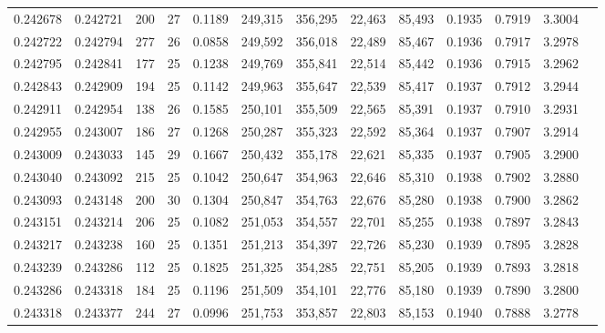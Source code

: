 \begin{tabular}{rrrrrrrrrrrrr}
0.242678 & 0.242721 &   200 &  27 &                                     0.1189 & 249,315 & 356,295 &  22,463 &  85,493 & 0.1935 & 0.7919 & 3.3004 \\
0.242722 & 0.242794 &   277 &  26 &                                     0.0858 & 249,592 & 356,018 &  22,489 &  85,467 & 0.1936 & 0.7917 & 3.2978 \\
0.242795 & 0.242841 &   177 &  25 &                                     0.1238 & 249,769 & 355,841 &  22,514 &  85,442 & 0.1936 & 0.7915 & 3.2962 \\
0.242843 & 0.242909 &   194 &  25 &                                     0.1142 & 249,963 & 355,647 &  22,539 &  85,417 & 0.1937 & 0.7912 & 3.2944 \\
0.242911 & 0.242954 &   138 &  26 &                                     0.1585 & 250,101 & 355,509 &  22,565 &  85,391 & 0.1937 & 0.7910 & 3.2931 \\
0.242955 & 0.243007 &   186 &  27 &                                     0.1268 & 250,287 & 355,323 &  22,592 &  85,364 & 0.1937 & 0.7907 & 3.2914 \\
0.243009 & 0.243033 &   145 &  29 &                                     0.1667 & 250,432 & 355,178 &  22,621 &  85,335 & 0.1937 & 0.7905 & 3.2900 \\
0.243040 & 0.243092 &   215 &  25 &                                     0.1042 & 250,647 & 354,963 &  22,646 &  85,310 & 0.1938 & 0.7902 & 3.2880 \\
0.243093 & 0.243148 &   200 &  30 &                                     0.1304 & 250,847 & 354,763 &  22,676 &  85,280 & 0.1938 & 0.7900 & 3.2862 \\
0.243151 & 0.243214 &   206 &  25 &                                     0.1082 & 251,053 & 354,557 &  22,701 &  85,255 & 0.1938 & 0.7897 & 3.2843 \\
0.243217 & 0.243238 &   160 &  25 &                                     0.1351 & 251,213 & 354,397 &  22,726 &  85,230 & 0.1939 & 0.7895 & 3.2828 \\
0.243239 & 0.243286 &   112 &  25 &                                     0.1825 & 251,325 & 354,285 &  22,751 &  85,205 & 0.1939 & 0.7893 & 3.2818 \\
0.243286 & 0.243318 &   184 &  25 &                                     0.1196 & 251,509 & 354,101 &  22,776 &  85,180 & 0.1939 & 0.7890 & 3.2800 \\
0.243318 & 0.243377 &   244 &  27 &                                     0.0996 & 251,753 & 353,857 &  22,803 &  85,153 & 0.1940 & 0.7888 & 3.2778 \\

\end{tabular}
